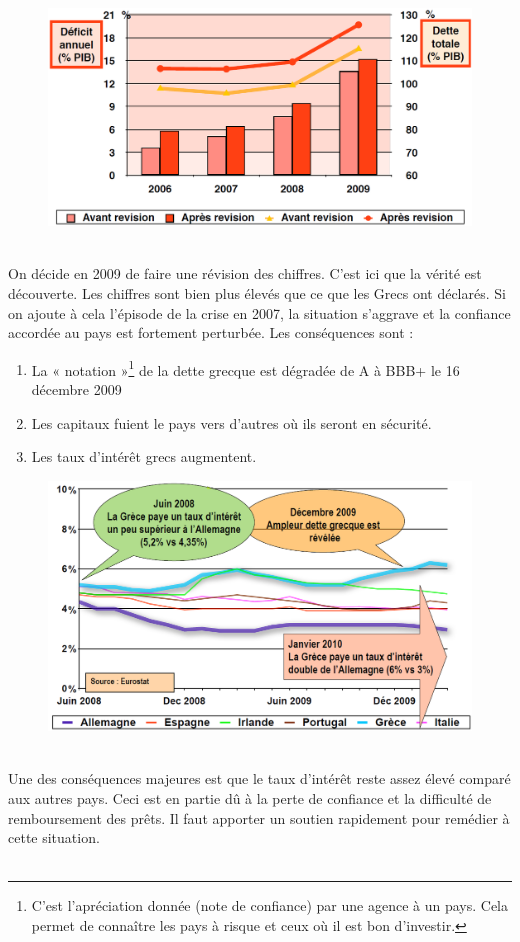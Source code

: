 \begin{figure}
	\includegraphics[scale=0.3]{37}
\end{figure}
\ \\ On décide en 2009 de faire une révision des chiffres. C'est ici que la vérité est découverte. Les chiffres sont bien plus élevés que ce que les Grecs ont déclarés. Si on ajoute à cela l'épisode de la crise en 2007, la situation s'aggrave et la confiance accordée au pays est fortement perturbée. Les conséquences sont :

\begin{enumerate}
	\item La « notation »\footnote{C'est l'apréciation donnée (note de confiance) par une agence à un pays. Cela permet de connaître les pays à risque et ceux où il est bon d'investir.} de la dette grecque est dégradée de A à BBB+ le 16 décembre 2009
	      
	\item Les capitaux fuient le pays vers d'autres où ils seront en sécurité.
	      	
	\item Les taux d’intérêt grecs augmentent.
\end{enumerate}   

\begin{figure}
	\includegraphics[scale=0.3]{38}
\end{figure}
\ \\ Une des conséquences majeures est que le taux d'intérêt reste assez élevé comparé aux autres pays. Ceci est en partie dû à la perte de confiance et la difficulté de remboursement des prêts. Il faut apporter un soutien rapidement pour remédier à cette situation. \\\\

